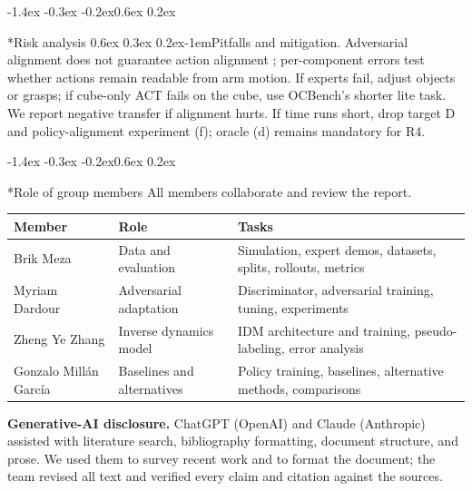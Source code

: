 \documentclass{article}
\makeatletter
\renewcommand{\section}{\@startsection{section}{1}{\z@}%
    {-1.4ex \@plus -0.3ex \@minus -0.2ex}{0.6ex \@plus 0.2ex}{\large\bf\raggedright}}%
\renewcommand{\paragraph}{\@startsection{paragraph}{4}{\z@}%
    {0.6ex \@plus 0.3ex \@minus 0.2ex}{-1em}{\normalsize\bf}}%
\makeatother
\begin{document}
\section*{Risk analysis}
\paragraph{Pitfalls and mitigation.}
Adversarial alignment does not guarantee action alignment \citep{zhao2019invariant};
per-component errors test whether actions remain readable from arm motion. If experts
fail, adjust objects or grasps; if cube-only ACT fails on the cube, use OCBench's
shorter lite task. We report negative transfer if alignment hurts. If time runs short,
drop target D and policy-alignment experiment (f); oracle (d) remains mandatory for R4.

\section*{Role of group members}
All members collaborate and review the report.

\begin{center}
\small
\begin{tabular}{@{}>{\raggedright\arraybackslash}p{2.6cm}>{\raggedright\arraybackslash}p{3.2cm}>{\raggedright\arraybackslash}p{6.7cm}@{}}
\toprule
Member & Role & Tasks \\
\midrule
Brik Meza & Data and evaluation & Simulation, expert demos, datasets, splits, rollouts, metrics \\
Myriam Dardour & Adversarial adaptation & Discriminator, adversarial training, tuning, experiments \\
Zheng Ye Zhang & Inverse dynamics model & IDM architecture and training, pseudo-labeling, error analysis \\
Gonzalo Millán García & Baselines and alternatives & Policy training, baselines, alternative methods, comparisons \\
\bottomrule
\end{tabular}
\end{center}

\clearpage
{\footnotesize\textbf{Generative-AI disclosure.} ChatGPT (OpenAI) and Claude
(Anthropic) assisted with literature search, bibliography formatting, document
structure, and prose. We used them to survey recent work and to format the
document; the team revised all text and verified every claim and citation against
the sources.}

{\small

}
\end{document}
